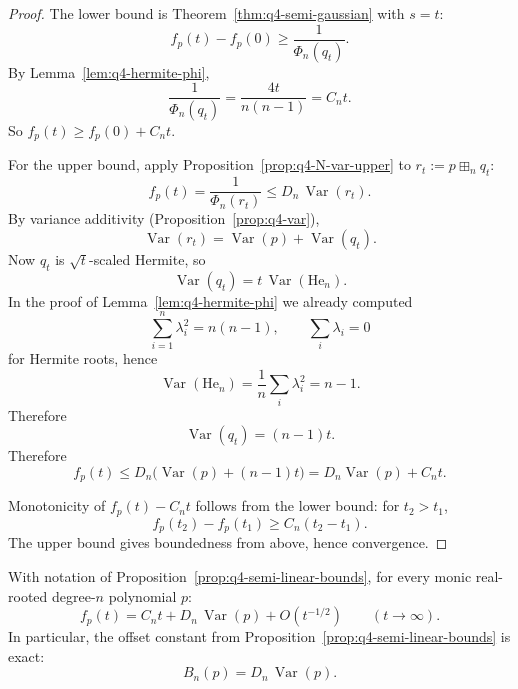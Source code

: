 \begin{proof}
The lower bound is Theorem~\ref{thm:q4-semi-gaussian} with
$s=t$:
\[
f_p(t)-f_p(0)\ge \frac1{\Phi_n(q_t)}.
\]
By Lemma~\ref{lem:q4-hermite-phi},
\[
\frac1{\Phi_n(q_t)}=\frac{4t}{n(n-1)}=C_n t.
\]
So $f_p(t)\ge f_p(0)+C_n t$.

For the upper bound, apply
Proposition~\ref{prop:q4-N-var-upper} to
$r_t:=p\boxplus_n q_t$:
\[
f_p(t)=\frac1{\Phi_n(r_t)}
\le D_n\,\operatorname{Var}(r_t).
\]
By variance additivity (Proposition~\ref{prop:q4-var}),
\[
\operatorname{Var}(r_t)=\operatorname{Var}(p)+\operatorname{Var}(q_t).
\]
Now $q_t$ is $\sqrt t$-scaled Hermite, so
\[
\operatorname{Var}(q_t)=t\,\operatorname{Var}(\mathrm{He}_n).
\]
In the proof of Lemma~\ref{lem:q4-hermite-phi} we already computed
\[
\sum_{i=1}^n \lambda_i^2=n(n-1),\qquad \sum_i\lambda_i=0
\]
for Hermite roots, hence
\[
\operatorname{Var}(\mathrm{He}_n)=\frac1n\sum_i\lambda_i^2=n-1.
\]
Therefore
\[
\operatorname{Var}(q_t)=(n-1)t.
\]
Therefore
\[
f_p(t)\le D_n\bigl(\operatorname{Var}(p)+(n-1)t\bigr)
=D_n\operatorname{Var}(p)+C_n t.
\]

Monotonicity of $f_p(t)-C_n t$ follows from the lower bound:
for $t_2>t_1$,
\[
f_p(t_2)-f_p(t_1)\ge C_n(t_2-t_1).
\]
The upper bound gives boundedness from above, hence convergence.
\end{proof}

\begin{proposition}\label{prop:q4-asymptotic-offset-exact}
With notation of Proposition~\ref{prop:q4-semi-linear-bounds},
for every monic real-rooted degree-$n$ polynomial $p$:
\[
f_p(t)=C_n t + D_n\,\operatorname{Var}(p)+O(t^{-1/2})
\qquad (t\to\infty).
\]
In particular, the offset constant from
Proposition~\ref{prop:q4-semi-linear-bounds} is exact:
\[
B_n(p)=D_n\,\operatorname{Var}(p).
\]
\end{proposition}

